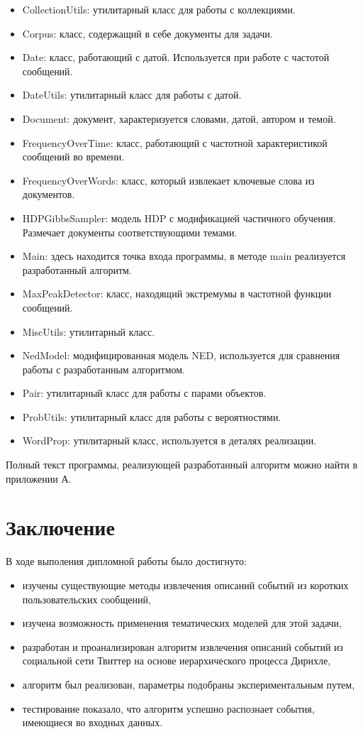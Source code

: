\documentclass[12pt, a4paper]{article}
\begin{document}
	\begin{itemize}
\item CollectionUtils: утилитарный класс для работы с коллекциями.
\item Corpus: класс, содержащий в себе документы для задачи.
\item Date: класс, работающий с датой. Используется при работе с частотой сообщений.
\item DateUtils: утилитарный класс для работы с датой.
\item Document: документ, характеризуется словами, датой, автором и темой.
\item FrequencyOverTime: класс, работающий с частотной характеристикой сообщений во времени.
\item FrequencyOverWords: класс, который извлекает ключевые слова из документов.
\item HDPGibbsSampler: модель HDP с модификацией частичного обучения. Размечает документы соответствующими темами.
\item Main: здесь находится точка входа программы, в методе main реализуется разработанный алгоритм.
\item MaxPeakDetector: класс, находящий экстремумы в частотной функции сообщений.
\item MiscUtils: утилитарный класс.
\item NedModel: модифицированная модель NED, используется для сравнения работы с разработанным алгоритмом.
\item Pair: утилитарный класс для работы с парами объектов.
\item ProbUtils: утилитарный класс для работы с вероятностями.
\item WordProp: утилитарный класс, используется в деталях реализации.
\end{itemize}

Полный текст программы, реализующей разработанный алгоритм можно найти в приложении А.
	
	
	\section*{Заключение}
	В ходе выполения дипломной работы было достигнуто:
	\begin{itemize}
	\item изучены существующие методы извлечения описаний событий из коротких пользовательских сообщений,
	\item изучена возможность применения тематических моделей для этой задачи,
	\item разработан и проанализирован алгоритм извлечения описаний событий из социальной сети Твиттер на основе иерархического процесса Дирихле,
	\item алгоритм был реализован, параметры подобраны экспериментальным путем,
	\item тестирование показало, что алгоритм успешно распознает события, имеющиеся во входных данных.
	\end{itemize}
	
\end{document}
